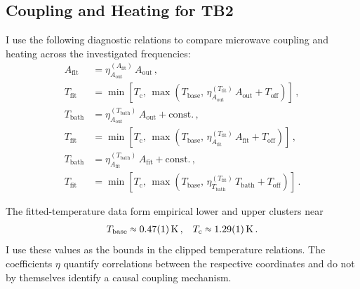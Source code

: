     \subsection*{Coupling and Heating for TB2}

        I use the following diagnostic relations to compare microwave coupling and heating across the investigated frequencies:
        \begin{equation}
            \begin{aligned}
                A_\mathrm{fit} &= \eta_{A_\mathrm{out}}^{(A_\mathrm{fit})}\, A_\mathrm{out}\,,\\
                T_\mathrm{fit} &= \min\!\left[T_\mathrm{c},\,\max\!\left(T_\mathrm{base},\,\eta_{A_\mathrm{out}}^{(T_\mathrm{fit})}\, A_\mathrm{out}+T_\mathrm{off}\right)\right]\,,\\
                T_\mathrm{bath} &= \eta_{A_\mathrm{out}}^{(T_\mathrm{bath})}\, A_\mathrm{out}+ \mathrm{const.}\,,\\
                T_\mathrm{fit} &= \min\!\left[T_\mathrm{c},\,\max\!\left(T_\mathrm{base},\,\eta_{A_\mathrm{fit}}^{(T_\mathrm{fit})}\, A_\mathrm{fit}+T_\mathrm{off}\right)\right]\,,\\
                T_\mathrm{bath} &= \eta_{A_\mathrm{fit}}^{(T_\mathrm{bath})}\, A_\mathrm{fit}+ \mathrm{const.}\,,\\
                T_\mathrm{fit} &= \min\!\left[T_\mathrm{c},\,\max\!\left(T_\mathrm{base},\,\eta_{T_\mathrm{bath}}^{(T_\mathrm{fit})}\, T_\mathrm{bath}+T_\mathrm{off}\right)\right]\,.
            \end{aligned}
            \label{eq:tb:asym:diagnostic-couplings}            
        \end{equation}

        The fitted-temperature data form empirical lower and upper clusters near
        \begin{align}
            T_\mathrm{base}\sapprox\qty{0.47(1)}{\kelvin}\,, &&
            T_\mathrm{c}\sapprox\qty{1.29(1)}{\kelvin}\,.
        \end{align}
        I use these values as the bounds in the clipped temperature relations. The coefficients $\eta$ quantify correlations between the respective coordinates and do not by themselves identify a causal coupling mechanism.

